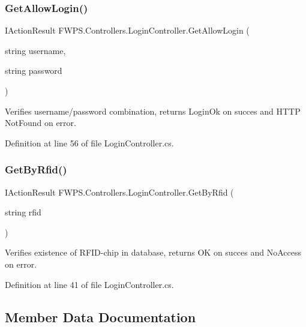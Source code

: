 \subsubsection{\texorpdfstring{Get\+Allow\+Login()}{GetAllowLogin()}}
{\footnotesize\ttfamily I\+Action\+Result F\+W\+P\+S.\+Controllers.\+Login\+Controller.\+Get\+Allow\+Login (\begin{DoxyParamCaption}\item[{string}]{username,  }\item[{string}]{password }\end{DoxyParamCaption})}



Verifies username/password combination, returns \textquotesingle{}Login\+Ok\textquotesingle{} on succes and H\+T\+TP Not\+Found on error. 



Definition at line 56 of file Login\+Controller.\+cs.

\mbox{\label{class_f_w_p_s_1_1_controllers_1_1_login_controller_a49bddd8fd1e610b022ce02189d3d8444}} 
\subsubsection{\texorpdfstring{Get\+By\+Rfid()}{GetByRfid()}}
{\footnotesize\ttfamily I\+Action\+Result F\+W\+P\+S.\+Controllers.\+Login\+Controller.\+Get\+By\+Rfid (\begin{DoxyParamCaption}\item[{string}]{rfid }\end{DoxyParamCaption})}



Verifies existence of R\+F\+I\+D-\/chip in database, returns \textquotesingle{}OK\textquotesingle{} on succes and \textquotesingle{}No\+Access\textquotesingle{} on error. 



Definition at line 41 of file Login\+Controller.\+cs.



\subsection{Member Data Documentation}
\mbox{\label{class_f_w_p_s_1_1_controllers_1_1_login_controller_a9acbf5235323be9f01a3411a40a34725}} 
